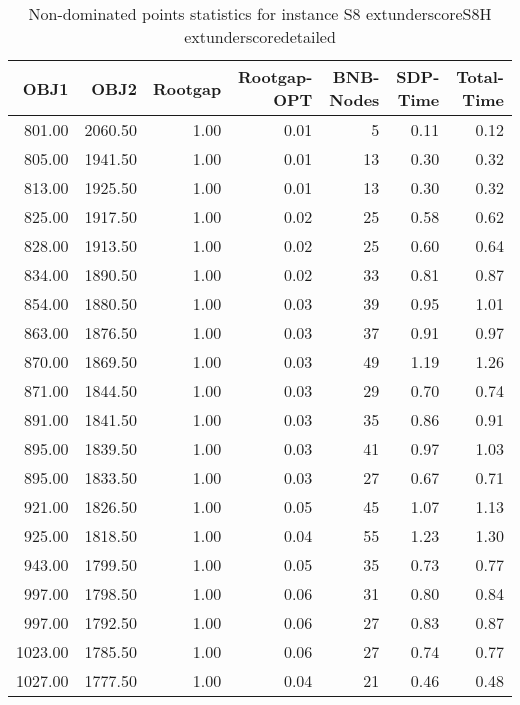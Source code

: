 \begin{table}
\caption{Non-dominated points statistics for instance S8	extunderscoreS8H	extunderscoredetailed}
\label{tab:plots/S8_S8H_detailed}
\begin{tabular}{rrrrrrr}
\toprule
OBJ1 & OBJ2 & Rootgap & Rootgap-OPT & BNB-Nodes & SDP-Time & Total-Time \\
\midrule
801.00 & 2060.50 & 1.00 & 0.01 & 5 & 0.11 & 0.12 \\
805.00 & 1941.50 & 1.00 & 0.01 & 13 & 0.30 & 0.32 \\
813.00 & 1925.50 & 1.00 & 0.01 & 13 & 0.30 & 0.32 \\
825.00 & 1917.50 & 1.00 & 0.02 & 25 & 0.58 & 0.62 \\
828.00 & 1913.50 & 1.00 & 0.02 & 25 & 0.60 & 0.64 \\
834.00 & 1890.50 & 1.00 & 0.02 & 33 & 0.81 & 0.87 \\
854.00 & 1880.50 & 1.00 & 0.03 & 39 & 0.95 & 1.01 \\
863.00 & 1876.50 & 1.00 & 0.03 & 37 & 0.91 & 0.97 \\
870.00 & 1869.50 & 1.00 & 0.03 & 49 & 1.19 & 1.26 \\
871.00 & 1844.50 & 1.00 & 0.03 & 29 & 0.70 & 0.74 \\
891.00 & 1841.50 & 1.00 & 0.03 & 35 & 0.86 & 0.91 \\
895.00 & 1839.50 & 1.00 & 0.03 & 41 & 0.97 & 1.03 \\
895.00 & 1833.50 & 1.00 & 0.03 & 27 & 0.67 & 0.71 \\
921.00 & 1826.50 & 1.00 & 0.05 & 45 & 1.07 & 1.13 \\
925.00 & 1818.50 & 1.00 & 0.04 & 55 & 1.23 & 1.30 \\
943.00 & 1799.50 & 1.00 & 0.05 & 35 & 0.73 & 0.77 \\
997.00 & 1798.50 & 1.00 & 0.06 & 31 & 0.80 & 0.84 \\
997.00 & 1792.50 & 1.00 & 0.06 & 27 & 0.83 & 0.87 \\
1023.00 & 1785.50 & 1.00 & 0.06 & 27 & 0.74 & 0.77 \\
1027.00 & 1777.50 & 1.00 & 0.04 & 21 & 0.46 & 0.48 \\
\bottomrule
\end{tabular}
\end{table}
